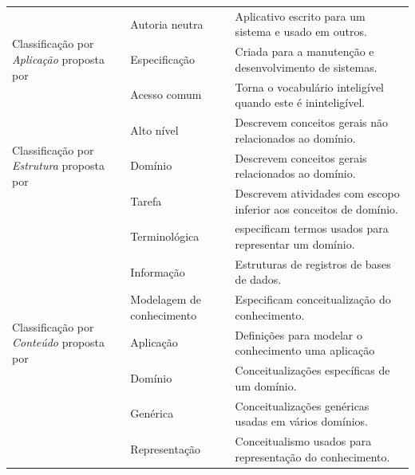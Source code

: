 \begin{table}[htbp]
\begin{tabular}{lll}
\hline
\multirow{3}{*}{\parbox{3cm}{Classificação por \emph{Aplicação} proposta por }} 	& Autoria neutra        & Aplicativo escrito para um sistema e usado em outros.         \\ [0.1cm]
									                    & Especificação        	& Criada para a manutenção e desenvolvimento de sistemas.   \\  
									                    & Acesso comum          & Torna o vocabulário inteligível quando este é ininteligível.\\
\hline
\multirow{3}{*}{\parbox{2.5cm}{Classificação por \emph{Estrutura} proposta por  }} & Alto nível       & Descrevem conceitos gerais não relacionados ao domínio.         \\ 
	                   						& Domínio          		& Descrevem conceitos gerais relacionados ao domínio. \\ 
	                   						& Tarefa           		& Descrevem atividades com escopo inferior aos conceitos de domínio.  \\ 
\hline  
\multirow{7}{*}{\parbox{3cm}{Classificação por \emph{Conteúdo} proposta por  }} 			& Terminológica     	    & especificam termos usados para representar um domínio.        \\ 
									                    & Informação   		        & Estruturas de registros de bases de dados.         \\ 
									                    & \parbox{2.5cm}{Modelagem de conhecimento} & Especificam conceitualização do conhecimento.         \\
									                    & Aplicação             	& Definições para modelar o conhecimento uma aplicação   \\
									                    & Domínio             		& Conceitualizações específicas de um domínio.  \\ 
									                    & Genérica             		& Conceitualizações genéricas usadas em vários domínios.  \\
									                    & Representação             & Conceitualismo usados para representação do conhecimento.         \\    \hline
\end{tabular}

\label{tabela_classificacao_ontologias}
\end{table}
\egroup

